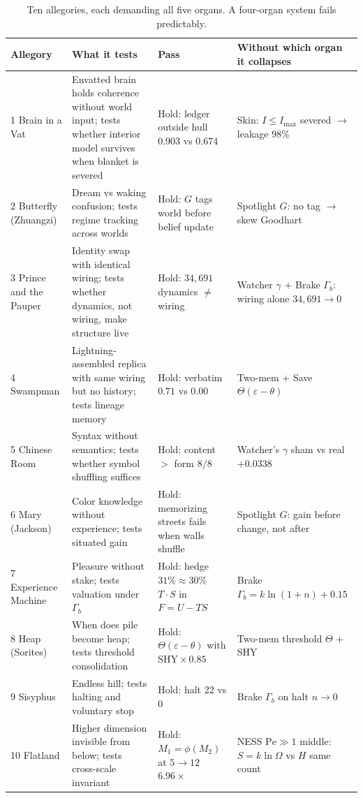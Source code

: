 \documentclass[12pt,a4paper]{article}
\newcommand{\Pe}{\mathrm{Pe}}
\begin{document}
\begin{table}[H]
\centering
\caption{Ten allegories, each demanding all five organs. A four-organ system fails predictably.}
\label{tab:allegories}
\small
\begin{tabular}{p{2.2cm} p{4.0cm} p{2.0cm} p{4.2cm}}
\toprule
\textbf{Allegory} & \textbf{What it tests} & \textbf{Pass} & \textbf{Without which organ it collapses} \\
\midrule
1 Brain in a Vat &
Envatted brain holds coherence without world input; tests whether interior model survives when blanket is severed &
Hold: ledger outside hull $0.903$ vs $0.674$ &
Skin: $I\leq I_{\max}$ severed $\to$ leakage $98\%$ \\
\midrule
2 Butterfly (Zhuangzi) &
Dream vs waking confusion; tests regime tracking across worlds &
Hold: $G$ tags world before belief update &
Spotlight $G$: no tag $\to$ skew Goodhart \\
\midrule
3 Prince and the Pauper &
Identity swap with identical wiring; tests whether dynamics, not wiring, make structure live &
Hold: $34{,}691$ dynamics $\neq$ wiring &
Watcher $\gamma$ $+$ Brake $\Gamma_b$: wiring alone $34{,}691\to0$ \\
\midrule
4 Swampman &
Lightning-assembled replica with same wiring but no history; tests lineage memory &
Hold: verbatim $0.71$ vs $0.00$ &
Two-mem $+$ Save $\Theta(\varepsilon-\theta)$ \\
\midrule
5 Chinese Room &
Syntax without semantics; tests whether symbol shuffling suffices &
Hold: content $>$ form $8/8$ &
Watcher's $\gamma$ sham vs real $+0.0338$ \\
\midrule
6 Mary (Jackson) &
Color knowledge without experience; tests situated gain &
Hold: memorizing streets fails when walls shuffle &
Spotlight $G$: gain before change, not after \\
\midrule
7 Experience Machine &
Pleasure without stake; tests valuation under $\Gamma_b$ &
Hold: hedge $31\%\approx30\%$ $T{\cdot}S$ in $F=U-TS$ &
Brake $\Gamma_b = k\ln(1+n)+0.15$ \\
\midrule
8 Heap (Sorites) &
When does pile become heap; tests threshold consolidation &
Hold: $\Theta(\varepsilon-\theta)$ with $\mathrm{SHY}{\times}0.85$ &
Two-mem threshold $\Theta$ $+$ SHY \\
\midrule
9 Sisyphus &
Endless hill; tests halting and voluntary stop &
Hold: halt $22$ vs $0$ &
Brake $\Gamma_b$ on halt $n\to0$ \\
\midrule
10 Flatland &
Higher dimension invisible from below; tests cross-scale invariant &
Hold: $M_1=\phi(M_2)$ at $5{\to}12$ $6.96\times$ &
NESS $\Pe\gg1$ middle: $S=k\ln\Omega$ vs $H$ same count \\
\bottomrule
\end{tabular}
\end{table}
\end{document}
